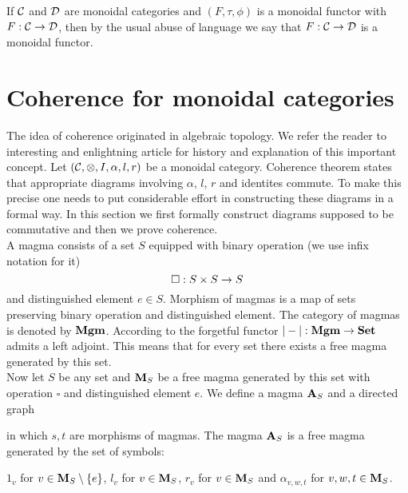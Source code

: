 \noindent
If ${\mathcal C}$ and ${\mathcal D}$ are monoidal categories and $(F,\tau,\phi)$ is a monoidal functor with $F:{\mathcal C}\rightarrow {\mathcal D}$, then by the usual abuse of language we say that $F:{\mathcal C}\rightarrow {\mathcal D}$ is a monoidal functor.

\section{Coherence for monoidal categories}
\noindent
The idea of coherence originated in algebraic topology. We refer the reader to interesting and enlightning article \cite{maclane1963natural} for history and explanation of this important concept. Let $({\mathcal C},\otimes, I,\alpha, l, r)$ be a monoidal category. Coherence theorem states that appropriate diagrams involving $\alpha$, $l$, $r$ and identites commute. To make this precise one needs to put considerable effort in constructing these diagrams in a formal way. In this section we first formally construct diagrams supposed to be commutative and then we prove coherence.\\
A magma consists of a set $S$ equipped with binary operation (we use infix notation for it)
$$\square:S\times S\rightarrow S$$
and distinguished element $e\in S$. Morphism of magmas is a map of sets preserving binary operation and distinguished element. The category of magmas is denoted by $\mathbf{Mgm}$. According to {\cite[Corollary 3.7.8]{borceux1994handbook}} the forgetful functor $|-|:\mathbf{Mgm}\rightarrow \mathbf{Set}$ admits a left adjoint. This means that for every set there exists a free magma generated by this set.\\
Now let $S$ be any set and $\mathbf{M}_S$ be a free magma generated by this set with operation $\square$ and distinguished element $e$. We define a magma $\mathbf{A}_S$ and a directed graph
\begin{center}
\end{center}
in which $s, t$ are morphisms of magmas. The magma $\mathbf{A}_S$ is a free magma generated by the set of symbols:
\begin{center}
$1_v$ for $v\in \mathbf{M}_S\setminus \{e\}$, $l_v$ for $v\in \mathbf{M}_S$, $r_v$ for $v\in \mathbf{M}_S$ and $\alpha_{v,w,t}$ for $v,w,t\in \mathbf{M}_S$.
\end{center}
